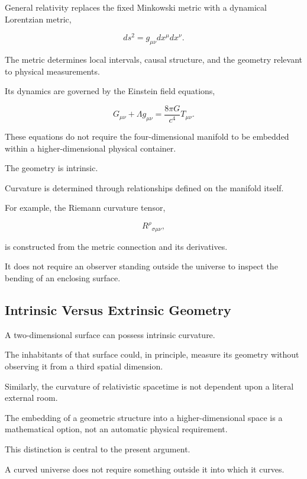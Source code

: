 \documentclass[12pt,onecolumn]{article}
\begin{document}
General relativity replaces the fixed
Minkowski metric with a dynamical
Lorentzian metric,

\begin{equation}
ds^2
=
g_{\mu\nu}dx^\mu dx^\nu.
\end{equation}

The metric determines local intervals,
causal structure, and the geometry
relevant to physical measurements.

Its dynamics are governed by the
Einstein field equations,

\begin{equation}
G_{\mu\nu}
+
\Lambda g_{\mu\nu}
=
\frac{8\pi G}{c^4}T_{\mu\nu}.
\end{equation}

These equations do not require the
four-dimensional manifold to be embedded
within a higher-dimensional physical
container.

The geometry is intrinsic.

Curvature is determined through
relationships defined on the manifold
itself.

For example, the Riemann curvature
tensor,

\begin{equation}
R^\rho{}_{\sigma\mu\nu},
\end{equation}

is constructed from the metric connection
and its derivatives.

It does not require an observer standing
outside the universe to inspect the
bending of an enclosing surface.

\subsection{Intrinsic Versus Extrinsic Geometry}

A two-dimensional surface can possess
intrinsic curvature.

The inhabitants of that surface could,
in principle, measure its geometry
without observing it from a third
spatial dimension.

Similarly, the curvature of relativistic
spacetime is not dependent upon a literal
external room.

The embedding of a geometric structure
into a higher-dimensional space is a
mathematical option, not an automatic
physical requirement.

This distinction is central to the
present argument.

A curved universe does not require
something outside it into which
it curves.
\end{document}

